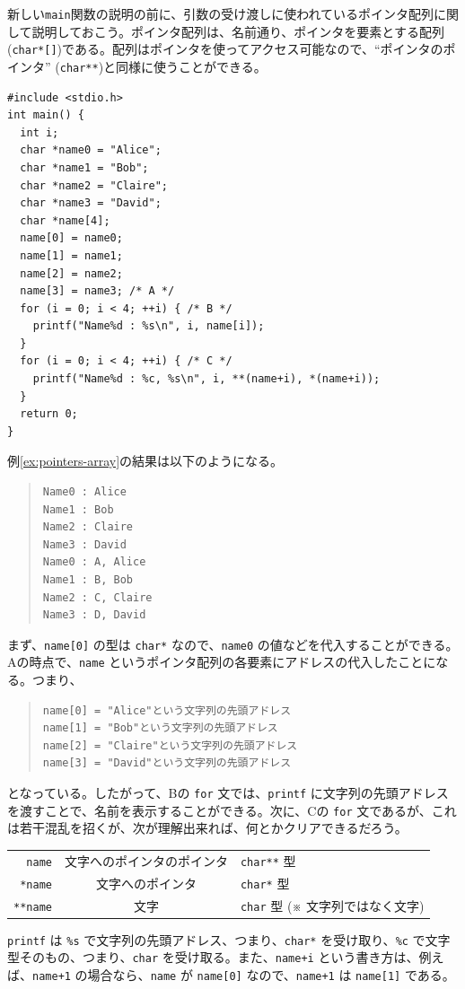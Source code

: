 新しい\verb|main|関数の説明の前に、引数の受け渡しに使われているポインタ配列に関して説明しておこう。ポインタ配列は、名前通り、ポインタを要素とする配列(\verb|char*[]|)である。配列はポインタを使ってアクセス可能なので、``ポインタのポインタ'' (\verb|char**|)と同様に使うことができる。
\begin{reidai}\label{ex:pointers-array}
\begin{verbatim}
#include <stdio.h>
int main() {
  int i;
  char *name0 = "Alice";
  char *name1 = "Bob";
  char *name2 = "Claire";
  char *name3 = "David";
  char *name[4];
  name[0] = name0;
  name[1] = name1;
  name[2] = name2;
  name[3] = name3; /* A */
  for (i = 0; i < 4; ++i) { /* B */
    printf("Name%d : %s\n", i, name[i]);
  }
  for (i = 0; i < 4; ++i) { /* C */
    printf("Name%d : %c, %s\n", i, **(name+i), *(name+i));
  }
  return 0;
}
\end{verbatim}
\end{reidai} \noindent
例\ref{ex:pointers-array}の結果は以下のようになる。
\begin{quote}
\begin{verbatim}
Name0 : Alice
Name1 : Bob
Name2 : Claire
Name3 : David
Name0 : A, Alice
Name1 : B, Bob
Name2 : C, Claire
Name3 : D, David
\end{verbatim}
\end{quote}
まず、\verb|name[0]| の型は \verb|char*| なので、\verb|name0| の値などを代入することができる。Aの時点で、\verb|name| というポインタ配列の各要素にアドレスの代入したことになる。つまり、
\begin{quote}
\begin{verbatim}
name[0] = "Alice"という文字列の先頭アドレス
name[1] = "Bob"という文字列の先頭アドレス
name[2] = "Claire"という文字列の先頭アドレス
name[3] = "David"という文字列の先頭アドレス
\end{verbatim}
\end{quote}
となっている。したがって、Bの \verb|for| 文では、\verb|printf| に文字列の先頭アドレスを渡すことで、名前を表示することができる。次に、Cの \verb|for| 文であるが、これは若干混乱を招くが、次が理解出来れば、何とかクリアできるだろう。
\begin{center}
\begin{tabular}{r@{ = }c@{ = }l}
\verb|name|   & 文字へのポインタのポインタ & \verb|char**| 型\\
\verb|*name|  & 文字へのポインタ           & \verb|char*| 型\\
\verb|**name| & 文字                       & \verb|char| 型 (※ 文字列ではなく文字)
\end{tabular}
\end{center}
\verb|printf| は \verb|%s| で文字列の先頭アドレス、つまり、\verb|char*| を受け取り、\verb|%c| で文字型そのもの、つまり、\verb|char| を受け取る。また、\verb|name+i| という書き方は、例えば、\verb|name+1| の場合なら、\verb|name| が \verb|name[0]| なので、\verb|name+1| は \verb|name[1]| である。


